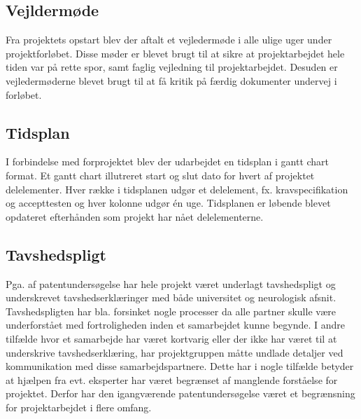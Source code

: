 \subsection{Vejldermøde}
Fra projektets opstart blev der aftalt et vejledermøde i alle ulige uger under projektforløbet. Disse møder er blevet brugt til at sikre at projektarbejdet hele tiden var på rette spor, samt faglig vejledning til projektarbejdet. Desuden er vejledermøderne blevet brugt til at få kritik på færdig dokumenter undervej i forløbet. 

\subsection{Tidsplan}
I forbindelse med forprojektet blev der udarbejdet en tidsplan i gantt chart format. Et gantt chart illutreret start og slut dato for hvert af projektet delelementer. Hver række i tidsplanen udgør et delelement, fx. kravspecifikation og accepttesten og hver kolonne udgør én uge. Tidsplanen er løbende blevet opdateret efterhånden som projekt har nået delelementerne.  

\subsection{Tavshedspligt} \label{title:tavshedspligt}
Pga. af patentundersøgelse har hele projekt været underlagt tavshedspligt og underskrevet tavshedserklæringer med både universitet og neurologisk afsnit. Tavshedspligten har bla. forsinket nogle processer da alle partner skulle være underforstået med fortroligheden inden et samarbejdet kunne begynde. I andre tilfælde hvor et samarbejde har været kortvarig eller der ikke har været til at underskrive tavshedserklæring, har projektgruppen måtte undlade detaljer ved kommunikation med disse samarbejdspartnere. Dette har i nogle tilfælde betyder at hjælpen fra evt. eksperter har været begrænset af manglende forståelse for projektet. Derfor har den igangværende patentundersøgelse været et begrænsning for projektarbejdet i flere omfang. 

